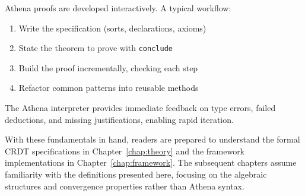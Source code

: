Athena proofs are developed interactively. A typical workflow:

\begin{enumerate}
  \item Write the specification (sorts, declarations, axioms)
  \item State the theorem to prove with \lstinline{conclude}
  \item Build the proof incrementally, checking each step
  \item Refactor common patterns into reusable methods
\end{enumerate}

The Athena interpreter provides immediate feedback on type errors, failed deductions, and missing justifications, enabling rapid iteration.

\bigskip

With these fundamentals in hand, readers are prepared to understand the formal CRDT specifications in Chapter~\ref{chap:theory} and the framework implementations in Chapter~\ref{chap:framework}. The subsequent chapters assume familiarity with the definitions presented here, focusing on the algebraic structures and convergence properties rather than Athena syntax.

\endinput
